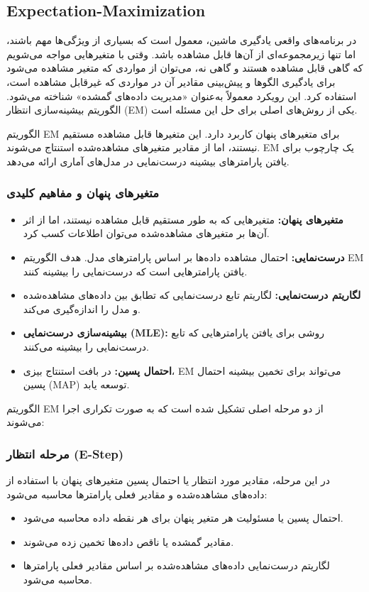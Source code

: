\documentclass[a4paper,12pt,openany]{report}
\begin{document}
	 \subsection{Expectation-Maximization}
	 
	 در برنامه‌های واقعی یادگیری ماشین، معمول است که بسیاری از ویژگی‌ها مهم باشند، اما تنها زیرمجموعه‌ای از آن‌ها قابل مشاهده باشد. وقتی با متغیرهایی مواجه می‌شویم که گاهی قابل مشاهده هستند و گاهی نه، می‌توان از مواردی که متغیر مشاهده می‌شود برای یادگیری الگوها و پیش‌بینی مقادیر آن در مواردی که غیرقابل مشاهده است، استفاده کرد. این رویکرد معمولاً به‌عنوان «مدیریت داده‌های گمشده» شناخته می‌شود. الگوریتم بیشینه‌سازی انتظار (EM) یکی از روش‌های اصلی برای حل این مسئله است.
	 
	 الگوریتم EM برای متغیرهای پنهان کاربرد دارد. این متغیرها قابل مشاهده مستقیم نیستند، اما از مقادیر متغیرهای مشاهده‌شده استنتاج می‌شوند. EM یک چارچوب برای یافتن پارامترهای بیشینه درست‌نمایی در مدل‌های آماری ارائه می‌دهد.
	 
	 \subsubsection*{متغیرهای پنهان و مفاهیم کلیدی}
	 
	 \begin{itemize}
	 	\item \textbf{متغیرهای پنهان:} متغیرهایی که به طور مستقیم قابل مشاهده نیستند، اما از اثر آن‌ها بر متغیرهای مشاهده‌شده می‌توان اطلاعات کسب کرد.
	 	\item \textbf{درست‌نمایی:} احتمال مشاهده داده‌ها بر اساس پارامترهای مدل. هدف الگوریتم EM یافتن پارامترهایی است که درست‌نمایی را بیشینه کنند.
	 	\item \textbf{لگاریتم درست‌نمایی:} لگاریتم تابع درست‌نمایی که تطابق بین داده‌های مشاهده‌شده و مدل را اندازه‌گیری می‌کند.
	 	\item \textbf{بیشینه‌سازی درست‌نمایی (MLE):} روشی برای یافتن پارامترهایی که تابع درست‌نمایی را بیشینه می‌کنند.
	 	\item \textbf{احتمال پسین:} در بافت استنتاج بیزی، EM می‌تواند برای تخمین بیشینه احتمال پسین (MAP) توسعه یابد.
	 \end{itemize}
	 
	 الگوریتم EM از دو مرحله اصلی تشکیل شده است که به صورت تکراری اجرا می‌شوند:
	 
	 \subsubsection*{مرحله انتظار (E-Step)}
	 در این مرحله، مقادیر مورد انتظار یا احتمال پسین متغیرهای پنهان با استفاده از داده‌های مشاهده‌شده و مقادیر فعلی پارامترها محاسبه می‌شود:
	 \begin{itemize}
	 	\item احتمال پسین یا مسئولیت هر متغیر پنهان برای هر نقطه داده محاسبه می‌شود.
	 	\item مقادیر گمشده یا ناقص داده‌ها تخمین زده می‌شوند.
	 	\item لگاریتم درست‌نمایی داده‌های مشاهده‌شده بر اساس مقادیر فعلی پارامترها محاسبه می‌شود.
	 \end{itemize}
	 
\end{document}
